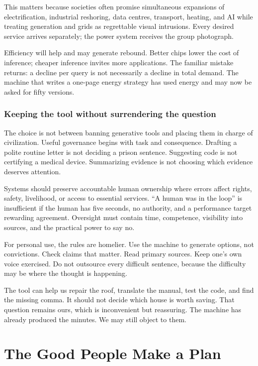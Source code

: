 \documentclass[12pt,a4paper]{book}
\begin{document}
This matters because societies often promise simultaneous expansions of
electrification, industrial reshoring, data centres, transport, heating, and
AI while treating generation and grids as regrettable visual intrusions.
Every desired service arrives separately; the power system receives the group
photograph.

Efficiency will help and may generate rebound.  Better chips lower the cost of
inference; cheaper inference invites more applications.  The familiar mistake
returns: a decline per query is not necessarily a decline in total demand.
The machine that writes a one-page energy strategy has used energy and may now
be asked for fifty versions.

\section{Keeping the tool without surrendering the question}

The choice is not between banning generative tools and placing them in charge
of civilization.  Useful governance begins with task and consequence.  Drafting
a polite routine letter is not deciding a prison sentence.  Suggesting code is
not certifying a medical device.  Summarizing evidence is not choosing which
evidence deserves attention.

Systems should preserve accountable human ownership where errors affect rights,
safety, livelihood, or access to essential services.  ``A human was in the
loop'' is insufficient if the human has five seconds, no authority, and a
performance target rewarding agreement.  Oversight must contain time,
competence, visibility into sources, and the practical power to say no.

For personal use, the rules are homelier.  Use the machine to generate options,
not convictions.  Check claims that matter.  Read primary sources.  Keep one's
own voice exercised.  Do not outsource every difficult sentence, because the
difficulty may be where the thought is happening.

The tool can help us repair the roof, translate the manual, test the code, and
find the missing comma.  It should not decide which house is worth saving.
That question remains ours, which is inconvenient but reassuring.  The machine
has already produced the minutes.  We may still object to them.

\part{The Good People Make a Plan}
\end{document}
